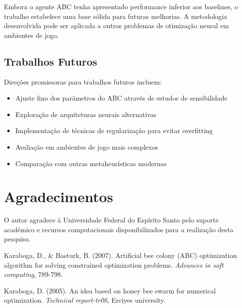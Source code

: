 \documentclass[review]{elsarticle}
\begin{document}
Embora o agente ABC tenha apresentado performance inferior aos baselines, o trabalho estabelece uma base sólida para futuras melhorias. A metodologia desenvolvida pode ser aplicada a outros problemas de otimização neural em ambientes de jogo.

\subsection{Trabalhos Futuros}

Direções promissoras para trabalhos futuros incluem:
\begin{itemize}
\item Ajuste fino dos parâmetros do ABC através de estudos de sensibilidade
\item Exploração de arquiteturas neurais alternativas
\item Implementação de técnicas de regularização para evitar overfitting
\item Avaliação em ambientes de jogo mais complexos
\item Comparação com outras metaheurísticas modernas
\end{itemize}

\section*{Agradecimentos}

O autor agradece à Universidade Federal do Espírito Santo pelo suporte académico e recursos computacionais disponibilizados para a realização desta pesquisa.

\begin{thebibliography}{10}

Karaboga, D., \& Basturk, B. (2007). 
\newblock Artificial bee colony (ABC) optimization algorithm for solving constrained optimization problems.
\newblock \emph{Advances in soft computing}, 789-798.

Karaboga, D. (2005).
\newblock An idea based on honey bee swarm for numerical optimization.
\newblock \emph{Technical report-tr06}, Erciyes university.

\end{thebibliography}
\end{document}
